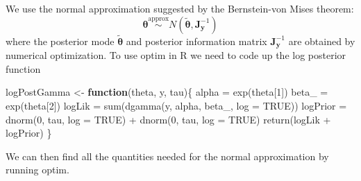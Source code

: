 \documentclass[
  letterpaper,
  DIV=11,
  numbers=noendperiod]{scrartcl}
\newenvironment{Shaded}{\begin{snugshade}}{\end{snugshade}}
\newcommand{\AttributeTok}[1]{\textcolor[rgb]{0.40,0.45,0.13}{#1}}
\newcommand{\ConstantTok}[1]{\textcolor[rgb]{0.56,0.35,0.01}{#1}}
\newcommand{\ControlFlowTok}[1]{\textcolor[rgb]{0.00,0.23,0.31}{\textbf{#1}}}
\newcommand{\DecValTok}[1]{\textcolor[rgb]{0.68,0.00,0.00}{#1}}
\newcommand{\FunctionTok}[1]{\textcolor[rgb]{0.28,0.35,0.67}{#1}}
\newcommand{\NormalTok}[1]{\textcolor[rgb]{0.00,0.23,0.31}{#1}}
\newcommand{\OtherTok}[1]{\textcolor[rgb]{0.00,0.23,0.31}{#1}}
\newcommand{\SpecialCharTok}[1]{\textcolor[rgb]{0.37,0.37,0.37}{#1}}
\begin{document}
\begin{tcolorbox}[enhanced jigsaw, opacityback=0, bottomrule=.15mm, title={Solution}, colback=white, colframe=quarto-callout-note-color-frame, breakable, toprule=.15mm, arc=.35mm, bottomtitle=1mm, left=2mm, coltitle=black, colbacktitle=quarto-callout-note-color!10!white, titlerule=0mm, rightrule=.15mm, toptitle=1mm, leftrule=.75mm, opacitybacktitle=0.6]

We use the normal approximation suggested by the Bernstein-von Mises
theorem: \[
\boldsymbol{\theta} \overset{\mathrm{approx}}{\sim} N(\tilde{\boldsymbol{\theta}}, \boldsymbol{J}^{-1}_{\mathbf{y}})
\] where the posterior mode \(\tilde{\boldsymbol{\theta}}\) and
posterior information matrix \(\boldsymbol{J}^{-1}_{\mathbf{y}}\) are
obtained by numerical optimization. To use optim in R we need to code up
the log posterior function

\begin{Shaded}
\begin{Highlighting}[]
\NormalTok{logPostGamma }\OtherTok{\textless{}{-}} \ControlFlowTok{function}\NormalTok{(theta, y, tau)\{}
\NormalTok{  alpha }\OtherTok{=} \FunctionTok{exp}\NormalTok{(theta[}\DecValTok{1}\NormalTok{])}
\NormalTok{  beta\_ }\OtherTok{=} \FunctionTok{exp}\NormalTok{(theta[}\DecValTok{2}\NormalTok{])}
\NormalTok{  logLik }\OtherTok{=} \FunctionTok{sum}\NormalTok{(}\FunctionTok{dgamma}\NormalTok{(y, alpha, beta\_, }\AttributeTok{log =} \ConstantTok{TRUE}\NormalTok{))}
\NormalTok{  logPrior }\OtherTok{=} \FunctionTok{dnorm}\NormalTok{(}\DecValTok{0}\NormalTok{, tau, }\AttributeTok{log =} \ConstantTok{TRUE}\NormalTok{) }\SpecialCharTok{+} \FunctionTok{dnorm}\NormalTok{(}\DecValTok{0}\NormalTok{, tau, }\AttributeTok{log =} \ConstantTok{TRUE}\NormalTok{)}
  \FunctionTok{return}\NormalTok{(logLik }\SpecialCharTok{+}\NormalTok{ logPrior)}
\NormalTok{\}}
\end{Highlighting}
\end{Shaded}

We can then find all the quantities needed for the normal approximation
by running optim.


\end{tcolorbox}
\end{document}
